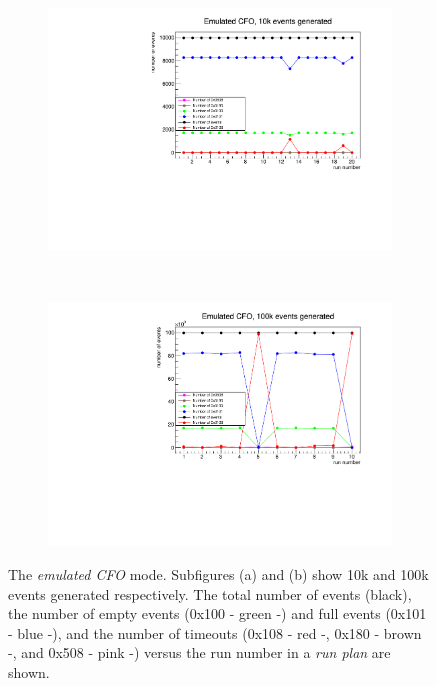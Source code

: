 \begin{figure}[!h]
  \centering
  \begin{subfigure}[t]{0.5\textwidth}
      \centering
      \includegraphics[width=1.1\textwidth]{figures/pdf/10k.pdf}
      \caption{}
  \end{subfigure}%
  ~ 
  \begin{subfigure}[t]{0.5\textwidth}
      \centering
      \includegraphics[width=1.1\textwidth]{figures/pdf/100k.pdf}
      \caption{}
  \end{subfigure}
  \caption{The \textit{emulated CFO} mode. Subfigures (a) and (b) show 10k and 100k events generated respectively. 
  The total number of events (black), the number of empty events (0x100 - green -) and full events (0x101 - blue -), 
  and the number of timeouts (0x108 - red -, 0x180 - brown -, and 0x508 - pink -) versus the run number in a \textit{run plan} are shown.
  }
  \label{fig:corruptionemulated}
\end{figure} 

